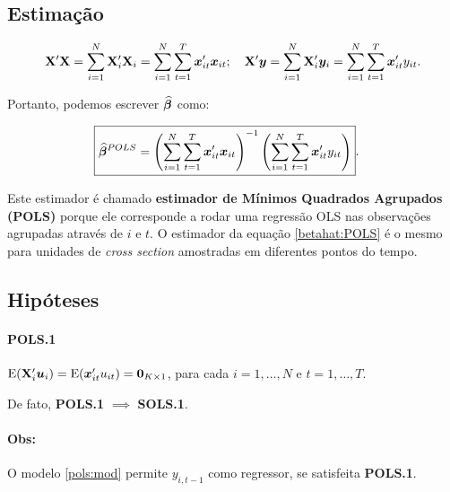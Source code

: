 \documentclass[11pt, oneside, a4paper, article]{article}
\numberwithin{equation}{section}
\begin{document}
\subsection{Estimação}

\begin{align*}
\mathbf{X}' \mathbf{X} 
=
\sum_{i=1}^{N} \mathbf{X}_{i}' \mathbf{X}_{i}
=
\sum_{i=1}^{N} \sum_{t=1}^{T} \boldsymbol{x}_{it}' \boldsymbol{x}_{it};
\quad
\mathbf{X}' \boldsymbol{y} 
=
\sum_{i=1}^{N} \mathbf{X}_{i}' \boldsymbol{y}_{i}
=
\sum_{i=1}^{N} \sum_{t=1}^{T} \boldsymbol{x}_{it}' y_{it}.
\end{align*}

Portanto, podemos escrever $\widehat{\boldsymbol{\beta}}$ como:

\vspace{-1 em}
\begin{align} \label{betahat:POLS}
\Aboxed{
\betahatbold^{POLS} =
\left( \sum_{i=1}^{N} \sum_{t=1}^{T} \xvec_{it}' \xvec_{it} \right)^{-1}
\left( \sum_{i=1}^{N} \sum_{t=1}^{T} \xvec_{it}' y_{it} \right)
}.
\end{align}

Este estimador é chamado \textbf{estimador de Mínimos Quadrados Agrupados (POLS)} porque ele corresponde a rodar uma regressão OLS nas observações agrupadas através de $i$ e $t$. 
O estimador da equação \eqref{betahat:POLS} é o mesmo para unidades de \textit{cross section} amostradas em diferentes pontos do tempo.

\subsection{Hipóteses}

\paragraph{POLS.1} $\text{E}(\mathbf{X}_{i}' \boldsymbol{u}_{i}) = \text{E}(\boldsymbol{x}_{it}'u_{it}) = \boldsymbol{0}_{K \times 1}$, para cada
$i=1, \dots, N$ e $t=1, \dots, T$.

\noindent
De fato, \textbf{POLS.1} $\implies$ \textbf{SOLS.1}.

\paragraph{Obs:}
O modelo \eqref{pols:mod} permite $y_{i,t-1}$ como regressor, se satisfeita \textbf{POLS.1}.
\end{document}
